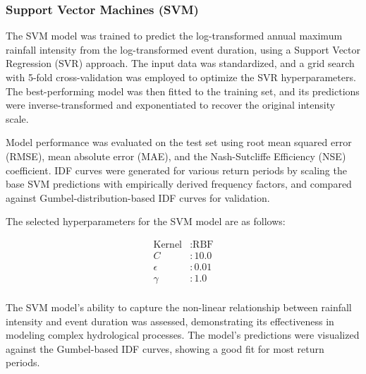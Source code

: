 \subsubsection{Support Vector Machines (SVM)}
The SVM model was trained to predict the log-transformed annual maximum rainfall intensity from the log-transformed event duration, using a Support Vector Regression (SVR) approach. The input data was standardized, and a grid search with 5-fold cross-validation was employed to optimize the SVR hyperparameters. The best-performing model was then fitted to the training set, and its predictions were inverse-transformed and exponentiated to recover the original intensity scale.

\vspace{1em}

Model performance was evaluated on the test set using root mean squared error (RMSE), mean absolute error (MAE), and the Nash-Sutcliffe Efficiency (NSE) coefficient. IDF curves were generated for various return periods by scaling the base SVM predictions with empirically derived frequency factors, and compared against Gumbel-distribution-based IDF curves for validation.

\vspace{1em}

The selected hyperparameters for the SVM model are as follows:

\begin{align*}
\text{Kernel} &: \text{RBF} \\
C &: 10.0 \\
\epsilon &: 0.01 \\
\gamma &: 1.0 \\
\end{align*}

The SVM model's ability to capture the non-linear relationship between rainfall intensity and event duration was assessed, demonstrating its effectiveness in modeling complex hydrological processes. The model's predictions were visualized against the Gumbel-based IDF curves, showing a good fit for most return periods.